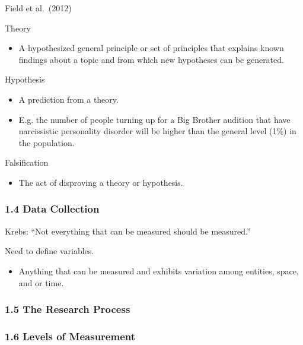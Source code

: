 \documentclass[]{article}
\providecommand{\tightlist}{%
  \setlength{\itemsep}{0pt}\setlength{\parskip}{0pt}}
\begin{document}
Field et al.~(2012)

Theory

\begin{itemize}
\tightlist
\item
  A hypothesized general principle or set of principles that explains
  known findings about a topic and from which new hypotheses can be
  generated.
\end{itemize}

Hypothesis

\begin{itemize}
\tightlist
\item
  A prediction from a theory.
\item
  E.g. the number of people turning up for a Big Brother audition that
  have narcissistic personality disorder will be higher than the general
  level (1\%) in the population.
\end{itemize}

Falsification

\begin{itemize}
\tightlist
\item
  The act of disproving a theory or hypothesis.
\end{itemize}

\hypertarget{data-collection}{%
\subsubsection{1.4 Data Collection}\label{data-collection}}

Krebs: ``Not everything that can be measured should be measured.''

Need to define variables.

\begin{itemize}
\tightlist
\item
  Anything that can be measured and exhibits variation among entities,
  space, and or time.
\end{itemize}

\hypertarget{the-research-process-1}{%
\subsubsection{1.5 The Research Process}\label{the-research-process-1}}

\hypertarget{levels-of-measurement}{%
\subsubsection{1.6 Levels of Measurement}\label{levels-of-measurement}}
\end{document}
